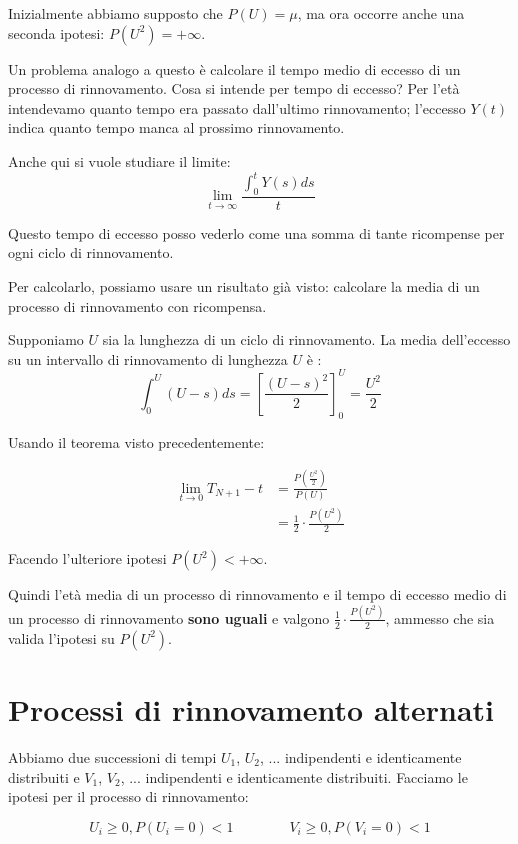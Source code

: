 \documentclass[a4paper,12pt]{book}
\begin{document}
Inizialmente abbiamo supposto che $ P(U) = \mu $, ma ora occorre anche una seconda ipotesi: $ P(U^2) = + \infty $.

Un problema analogo a questo è calcolare il tempo medio di eccesso di un processo di rinnovamento. Cosa si intende per tempo di eccesso? Per l'età intendevamo quanto tempo era passato dall'ultimo rinnovamento; l'eccesso $ Y(t) $ indica quanto tempo manca al prossimo rinnovamento. 


Anche qui si vuole studiare il limite:
$$ \lim\limits_{t \to \infty} \frac{\int_0^t Y(s)ds}{t} $$

Questo tempo di eccesso posso vederlo come una somma di tante ricompense per ogni ciclo di rinnovamento.

Per calcolarlo, possiamo usare un risultato già visto: calcolare la media di un processo di rinnovamento con ricompensa.

Supponiamo $ U $ sia la lunghezza di un ciclo di rinnovamento. La media dell'eccesso su un intervallo di rinnovamento di lunghezza $ U $ è :
$$ \int_{0}^{U}(U-s)ds = \left[ \frac{(U-s)^2}{2}\right]^U_0 = \frac{U^2}{2} $$

Usando il teorema visto precedentemente:

\begin{align*}
	\lim\limits_{t\to 0} T_{N+1} - t & = \frac{P(\frac{U^2}{2})}{P(U)}\\
	& = \frac{1}{2} \cdot \frac{P(U^2)}{2}
\end{align*}

Facendo l'ulteriore ipotesi $ P(U^2) < + \infty $.

Quindi l'età media di un processo di rinnovamento e il tempo di eccesso medio di un processo di rinnovamento \textbf{sono uguali} e valgono $ \frac{1}{2} \cdot \frac{P(U^2)}{2} $, ammesso che sia valida l'ipotesi su $ P(U^2) $.

\section{Processi di rinnovamento alternati}
Abbiamo due successioni di tempi $ U_1 $, $ U_2 $, ... indipendenti e identicamente distribuiti e $ V_1 $, $ V_2 $, ... indipendenti e identicamente distribuiti. Facciamo le ipotesi per il processo di rinnovamento:

$$ U_i \ge 0, P(U_i = 0) < 1 \qquad \qquad V_i \ge 0, P(V_i = 0) < 1 $$
\end{document}
